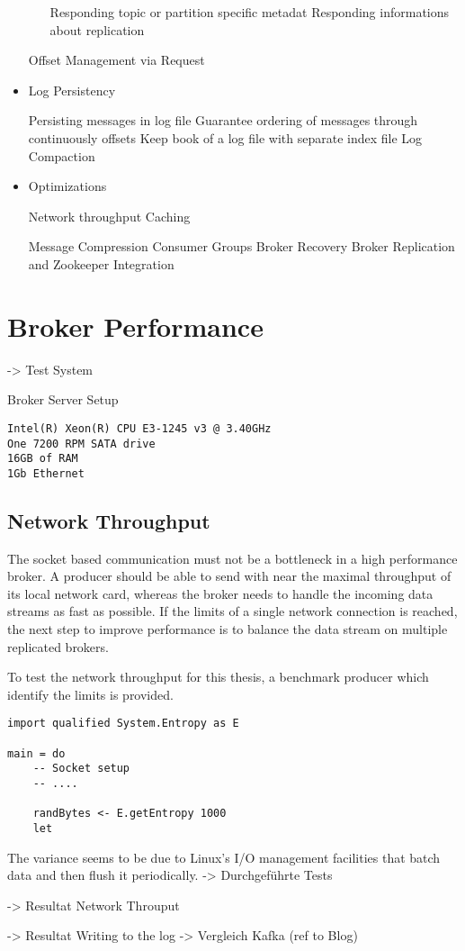 \begin{itemize}
\begin{itemize}
        \fail Responding topic or partition specific metadat
        \fail Responding informations about replication 
    \end{itemize}
    \fail Offset Management via Request
    \item Log Persistency
    \begin{itemize}
        \tick Persisting messages in log file
        \tick Guarantee ordering of messages through continuously offsets
        \tick Keep book of a log file with separate index file 
        \fail Log Compaction 
    \end{itemize}
    \item Optimizations 
    \begin{itemize}
        \tick Network throughput 
        \tick Caching
    \end{itemize}
    \fail Message Compression 
    \fail Consumer Groups 
    \fail Broker Recovery
    \fail Broker Replication and Zookeeper Integration
   \end{itemize}

\section{Broker Performance}
-> Test System

Broker Server Setup
\begin{verbatim}
Intel(R) Xeon(R) CPU E3-1245 v3 @ 3.40GHz
One 7200 RPM SATA drive
16GB of RAM
1Gb Ethernet 
\end{verbatim}

\subsection{Network Throughput}
The socket based communication must not be a bottleneck in a high performance
broker. A producer should be able to send with near the maximal throughput of
its local network card, whereas the broker needs to handle the incoming data
streams as fast as possible. If the limits of a single network connection is
reached, the next step to improve performance is to balance the data
stream on multiple replicated brokers.

To test the network throughput for this thesis, a benchmark producer
which identify the limits is provided.

\begin{lstlisting}
import qualified System.Entropy as E

main = do 
    -- Socket setup 
    -- ....

    randBytes <- E.getEntropy 1000
    let
\end{lstlisting}


The variance seems to be due to Linux's I/O management facilities that batch
data and then flush it periodically.
-> Durchgeführte Tests 

-> Resultat Network Throuput 

-> Resultat Writing to the log 
-> Vergleich Kafka (ref to Blog) 


